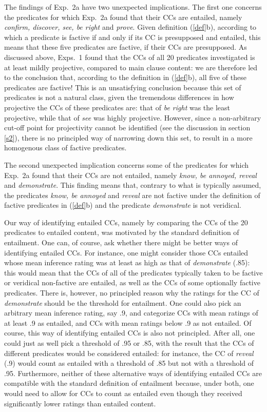 \documentclass[11pt,fleqn]{article}
\newcommand{\6}{\mbox{$[\hspace*{-.6mm}[$}}
\newcommand{\9}{\mbox{$]\hspace*{-.6mm}]$}}
\begin{document}
The findings of Exp.~2a have two unexpected implications. The first one concerns the predicates for which Exp.~2a found that their CCs are entailed, namely {\em confirm, discover, see, be right} and {\em prove}. Given definition (\ref{def}b), according to which a predicate is factive if and only if its CC is presupposed and entailed, this means that these five predicates are factive, if their CCs are presupposed. As discussed above, Exps.~1 found that the CCs of all 20 predicates investigated is at least mildly projective, compared to main clause content: we are therefore led to the conclusion that, according to the definition in (\ref{def}b), all five of these predicates are factive! This is an unsatisfying conclusion because this set of predicates is not a natural class, given the tremendous differences in how projective the CCs of these predicates are: that of {\em be right} was the least projective, while that of {\em see} was highly projective. However, since a non-arbitrary cut-off point for projectivity cannot be identified (see the discussion in section \ref{s2}), there is no principled way of narrowing down this set, to result in a more homogenous class of factive predicates.

The second unexpected implication concerns some of the predicates for which Exp.~2a found that their CCs are not entailed, namely {\em know, be annoyed, reveal} and {\em demonstrate}. This finding means that, contrary to what is typically assumed, the predicates {\em know, be annoyed} and {\em reveal} are not factive under the definition of factive predicates in (\ref{def}b) and the predicate {\em demonstrate} is not veridical.

Our way of identifying entailed CCs, namely by comparing the CCs of the 20 predicates to entailed content, was motivated by the standard definition of entailment. One can, of course, ask whether there might be better ways of identifying entailed CCs. For instance, one might consider those CCs entailed whose mean inference rating was at least as high as that of {\em demonstrate} (.85): this would mean that the CCs of all of the predicates typically taken to be factive or veridical non-factive are entailed, as well as the CCs of some optionally factive predicates. There is, however, no principled reason why the ratings for the CC of {\em demonstrate} should be the threshold for entailment. One could also pick an arbitrary mean inference rating, say .9, and categorize CCs with mean ratings of at least .9 as entailed, and CCs with mean ratings below .9 as not entailed. Of course, this way of identifying entailed CCs is also not principled. After all, one could just as well pick a threshold of .95 or .85, with the result that the CCs of different predicates would be considered entailed: for instance, the CC of {\em reveal} (.9) would count as entailed with a threshold of .85 but not with a threshold of .95. Furthermore, neither of these alternative ways of identifying entailed CCs are compatible with the standard definition of entailment because, under both, one would need to allow for CCs to count as entailed even though they received significantly lower ratings than entailed content.
\end{document}
